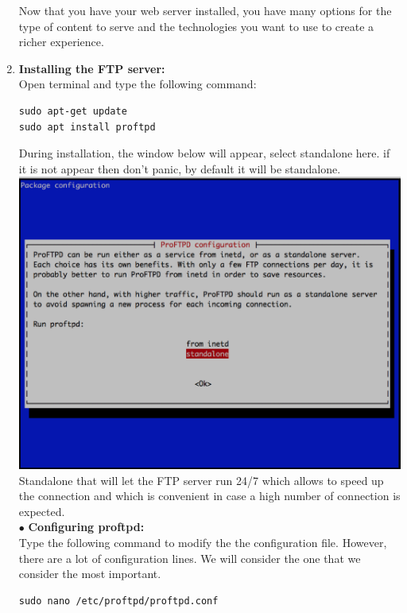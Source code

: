\documentclass[journal,12pt,onecolumn]{IEEEtran}
\begin{document}
\begin{flushleft}
\begin{enumerate}
Now that you have your web server installed, you have many options for the type of content to serve and the technologies you want to use to create a richer experience.\\
\medskip
\item{\textbf{Installing the FTP server:}} \\
Open terminal and type the following command: \\
\medskip
\begin{lstlisting}[frame=single,linewidth=9cm,breaklines=true]
sudo apt-get update
sudo apt install proftpd
\end{lstlisting}
\bigskip
During installation, the window below will appear, select standalone here. if it is not appear then don’t panic, by default it will be standalone.\\
\medskip
\includegraphics[scale=.2]{img8.eps} \\
\medskip
Standalone that will let the FTP server run 24/7 which allows to speed up the connection and which is convenient in case a high number of connection is expected.\\
\bigskip
$\bullet$ {\textbf{Configuring proftpd:}} \\
Type the following command to modify the the configuration file. However, there are a lot of configuration lines. We will consider the one that we consider the most important.\\
\medskip
\begin{lstlisting}[frame=single,linewidth=9cm,breaklines=true]
sudo nano /etc/proftpd/proftpd.conf
\end{lstlisting}

\end{enumerate}
\end{flushleft}
\end{document}
